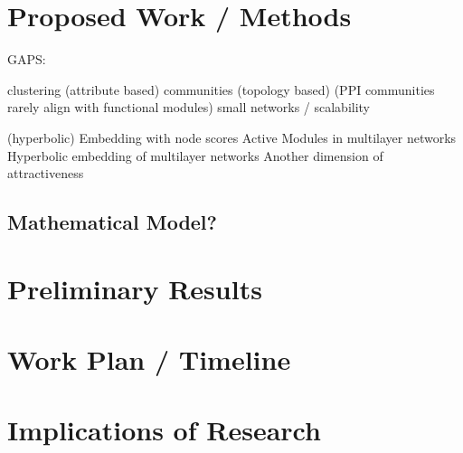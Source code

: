 \documentclass{report}
\begin{document}
	
	\chapter{Proposed Work / Methods}
	
	GAPS:
	
	clustering (attribute based)
	communities (topology based) (PPI communities rarely align with functional modules)
	small networks / scalability
	
	(hyperbolic) Embedding with node scores 
	Active Modules in multilayer networks
	Hyperbolic embedding of multilayer networks 
	Another dimension of attractiveness
	
	\section{Mathematical Model?}
	
	\chapter{Preliminary Results}
	
	
	
	\chapter{Work Plan / Timeline}
	
	
	
	
	\chapter{Implications of Research}
	
	
	
	
	
	
	
	
\end{document}
